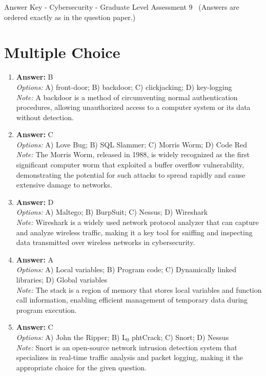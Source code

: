 \documentclass[12pt]{article}
\begin{document}
\begin{center}
Answer Key - Cybersecurity - Graduate Level Assessment 9 \
\small (Answers are ordered exactly as in the question paper.)
\end{center}

\section*{Multiple Choice}
\begin{enumerate}[label=\arabic*.]
\item \textbf{Answer:} B
\\ \textit{Options:} A) front-door; B) backdoor; C) clickjacking; D) key-logging
\\ \textit{Note:} A backdoor is a method of circumventing normal authentication procedures, allowing unauthorized access to a computer system or its data without detection.
\item \textbf{Answer:} C
\\ \textit{Options:} A) Love Bug; B) SQL Slammer; C) Morris Worm; D) Code Red
\\ \textit{Note:} The Morris Worm, released in 1988, is widely recognized as the first significant computer worm that exploited a buffer overflow vulnerability, demonstrating the potential for such attacks to spread rapidly and cause extensive damage to networks.
\item \textbf{Answer:} D
\\ \textit{Options:} A) Maltego; B) BurpSuit; C) Nessus; D) Wireshark
\\ \textit{Note:} Wireshark is a widely used network protocol analyzer that can capture and analyze wireless traffic, making it a key tool for sniffing and inspecting data transmitted over wireless networks in cybersecurity.
\item \textbf{Answer:} A
\\ \textit{Options:} A) Local variables; B) Program code; C) Dynamically linked libraries; D) Global variables
\\ \textit{Note:} The stack is a region of memory that stores local variables and function call information, enabling efficient management of temporary data during program execution.
\item \textbf{Answer:} C
\\ \textit{Options:} A) John the Ripper; B) L$_{0}$ phtCrack; C) Snort; D) Nessus
\\ \textit{Note:} Snort is an open-source network intrusion detection system that specializes in real-time traffic analysis and packet logging, making it the appropriate choice for the given question.
\end{enumerate}
\end{document}
